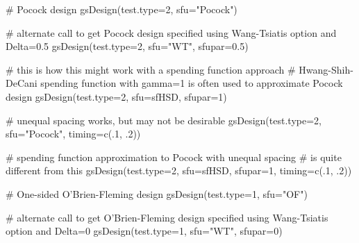 \begin{Examples}
\begin{ExampleCode}
# Pocock design
gsDesign(test.type=2, sfu="Pocock")

# alternate call to get Pocock design specified using Wang-Tsiatis option and Delta=0.5
gsDesign(test.type=2, sfu="WT", sfupar=0.5)

# this is how this might work with a spending function approach
# Hwang-Shih-DeCani spending function with gamma=1 is often used to approximate Pocock design
gsDesign(test.type=2, sfu=sfHSD, sfupar=1)

# unequal spacing works,  but may not be desirable 
gsDesign(test.type=2, sfu="Pocock", timing=c(.1, .2))

# spending function approximation to Pocock with unequal spacing 
# is quite different from this
gsDesign(test.type=2, sfu=sfHSD, sfupar=1, timing=c(.1, .2))

# One-sided O'Brien-Fleming design
gsDesign(test.type=1, sfu="OF")

# alternate call to get O'Brien-Fleming design specified using Wang-Tsiatis option and Delta=0
gsDesign(test.type=1, sfu="WT", sfupar=0)
\end{ExampleCode}
\end{Examples}


